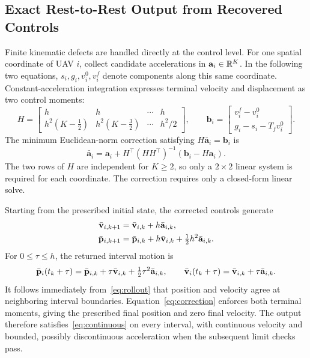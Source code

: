 \subsection{Exact Rest-to-Rest Output from Recovered Controls}
\label{sec:arcs}
Finite kinematic defects are handled directly at the control level. For one spatial coordinate of UAV $i$, collect candidate accelerations in $\mathbf a_i\in\mathbb{R}^K$. In the following two equations, $s_i,g_i,v_i^0,v_i^f$ denote components along this same coordinate. Constant-acceleration integration expresses terminal velocity and displacement as two control moments:
\begin{equation}
 H=
 \begin{bmatrix}
 h&h&\cdots&h\\
 h^2(K-\tfrac12)&h^2(K-\tfrac32)&\cdots&h^2/2
 \end{bmatrix},\qquad
 \mathbf b_i=\begin{bmatrix}v_i^f-v_i^0\\g_i-s_i-T_f v_i^0\end{bmatrix}.
 \label{eq:moments}
\end{equation}
The minimum Euclidean-norm correction satisfying $H\bar{\mathbf a}_i=\mathbf b_i$ is
\begin{equation}
 \bar{\mathbf a}_i=\mathbf a_i+
 H^\top(HH^\top)^{-1}(\mathbf b_i-H\mathbf a_i).
 \label{eq:correction}
\end{equation}
The two rows of $H$ are independent for $K\geq2$, so only a $2\times2$ linear system is required for each coordinate. The correction requires only a closed-form linear solve.

Starting from the prescribed initial state, the corrected controls generate
\begin{subequations}\label{eq:rollout}\begin{align}
 \bar{\mathbf{v}}_{i,k+1}&=\bar{\mathbf{v}}_{i,k}+h\bar{\mathbf{a}}_{i,k},\\
 \bar{\mathbf{p}}_{i,k+1}&=\bar{\mathbf{p}}_{i,k}+h\bar{\mathbf{v}}_{i,k}+\tfrac12h^2\bar{\mathbf{a}}_{i,k}.
\end{align}\end{subequations}
For $0\leq\tau\leq h$, the returned interval motion is
\begin{equation}
 \bar{\mathbf{p}}_i(t_k+\tau)=\bar{\mathbf{p}}_{i,k}+\tau\bar{\mathbf{v}}_{i,k}
 +\tfrac12\tau^2\bar{\mathbf{a}}_{i,k},\qquad
 \bar{\mathbf{v}}_i(t_k+\tau)=\bar{\mathbf{v}}_{i,k}+\tau\bar{\mathbf{a}}_{i,k}.
 \label{eq:arc}
\end{equation}
It follows immediately from~\eqref{eq:rollout} that position and velocity agree at neighboring interval boundaries. Equation~\eqref{eq:correction} enforces both terminal moments, giving the prescribed final position and zero final velocity. The output therefore satisfies~\eqref{eq:continuous} on every interval, with continuous velocity and bounded, possibly discontinuous acceleration when the subsequent limit checks pass.

